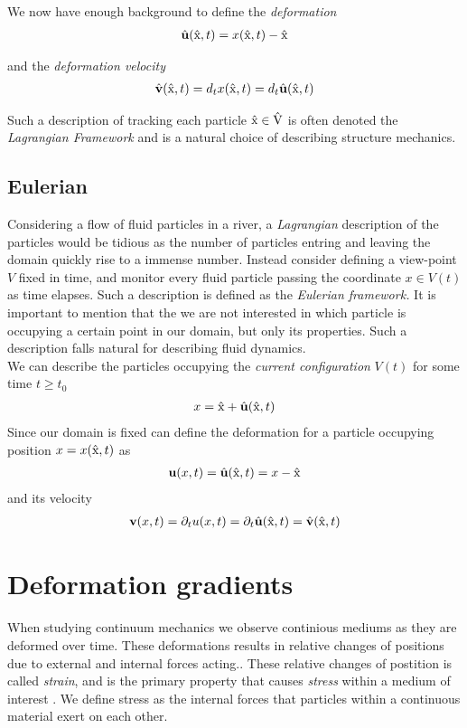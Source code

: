 We now have enough background to define the \textit{deformation} 
\begin{align}
\hat{u}(\ha{x},t) = x(\ha{x},t) - \ha{x} 
\end{align}

and the \textit{deformation velocity}
\begin{align}
\hat{v}(\ha{x},t) = d_t x(\ha{x},t) = d_t \hat{u}(\ha{x},t) 
\end{align}

Such a description of tracking each particle $\text{\^{x}} \in \text{\^{V}}$ is often denoted the \textit{Lagrangian Framework} and is a natural choice of describing structure mechanics.
\subsection{Eulerian}
Considering a flow of fluid particles in a river, a \textit{Lagrangian} description of the particles would be tidious as the number of particles entring and leaving the domain quickly rise to a immense number. 
Instead consider defining a view-point $V$ fixed in time, and monitor every fluid particle passing the coordinate $x \in V(t)$ as time elapses. Such a description is defined as the \textit{Eulerian framework.} 
It is important to mention that the we are not interested in which particle is occupying a certain point in our domain, but only its properties. Such a description falls natural for describing fluid dynamics. \\
We can describe the particles occupying the \textit{current configuration} $V(t)$ for some time $t \geq t_0$ 
\begin{align*}
x = \ha{x} + \hat{u}(\ha{x}, t)	
\end{align*}
Since our domain is fixed can define the deformation for a particle 
occupying position $x = x(\text{\^{x}},t)$ as
\begin{align*}
\textbf{u}(x, t) = \hat{u}(\ha{x}, t) = x - \ha{x}	\\
\end{align*}
and its velocity
\begin{align*}
\textbf{v}(x,t) = \partial_t u(x,t) = \partial_t \hat{u}(\ha{x},t) = \hat{v}(\ha{x},t)
\end{align*}

\section{Deformation gradients}
When studying continuum mechanics we observe continious mediums as they are deformed over time. These deformations
results in relative changes of positions due to external and internal forces acting.. These relative changes of postition is called
\textit{strain}, and is the primary property that causes \textit{stress} within a medium of interest \cite{Richter2016}. We define stress as the internal forces that particles within a continuous material exert on each other. \\

